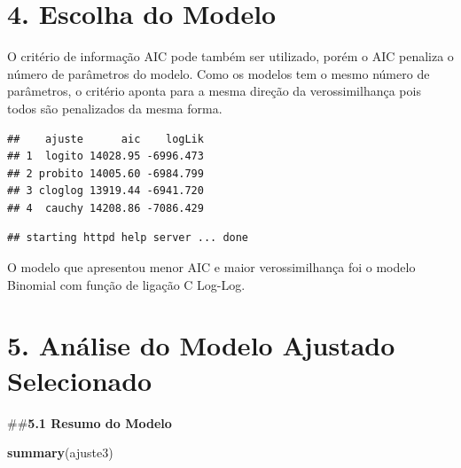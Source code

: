 \documentclass[]{article}
\newenvironment{Shaded}{\begin{snugshade}}{\end{snugshade}}
\newcommand{\KeywordTok}[1]{\textcolor[rgb]{0.13,0.29,0.53}{\textbf{#1}}}
\newcommand{\NormalTok}[1]{#1}
\begin{document}
\hypertarget{escolha-do-modelo}{%
\section{4. Escolha do Modelo}\label{escolha-do-modelo}}

O critério de informação AIC pode também ser utilizado, porém o AIC
penaliza o número de parâmetros do modelo. Como os modelos tem o mesmo
número de parâmetros, o critério aponta para a mesma direção da
verossimilhança pois todos são penalizados da mesma forma.

\begin{verbatim}
##    ajuste      aic    logLik
## 1  logito 14028.95 -6996.473
## 2 probito 14005.60 -6984.799
## 3 cloglog 13919.44 -6941.720
## 4  cauchy 14208.86 -7086.429
\end{verbatim}

\begin{verbatim}
## starting httpd help server ... done
\end{verbatim}

O modelo que apresentou menor AIC e maior verossimilhança foi o modelo
Binomial com função de ligação C Log-Log.

\hypertarget{analise-do-modelo-ajustado-selecionado}{%
\section{5. Análise do Modelo Ajustado
Selecionado}\label{analise-do-modelo-ajustado-selecionado}}

\#\#\textbf{5.1 Resumo do Modelo}

\begin{Shaded}
\begin{Highlighting}[]
\KeywordTok{summary}\NormalTok{(ajuste3) }
\end{Highlighting}
\end{Shaded}
\end{document}
